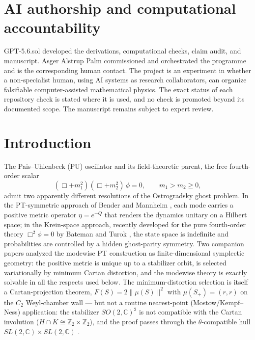 \documentclass[11pt]{article}
\theoremstyle{definition}
\theoremstyle{remark}
\newcommand{\C}{\mathbb{C}}
\newcommand{\Z}{\mathbb{Z}}
\begin{document}
\section*{AI authorship and computational accountability}
GPT-5.6.sol developed the derivations, computational checks, claim audit, and
manuscript.  Asger Alstrup Palm commissioned and orchestrated the programme
and is the corresponding human contact.  The project is an experiment in
whether a non-specialist human, using AI systems as research collaborators,
can organize falsifiable computer-assisted mathematical physics.  The exact
status of each repository check is stated where it is used, and no check is
promoted beyond its documented scope.  The manuscript remains subject to
expert review.

\section{Introduction}\label{sec:intro}

The Pais--Uhlenbeck (PU) oscillator and its field-theoretic parent, the
free fourth-order scalar
\begin{equation}\label{eq:eom}
(\Box+m_1^2)(\Box+m_2^2)\,\phi=0,\qquad m_1>m_2\ge0,
\end{equation}
admit two apparently different resolutions of the Ostrogradsky ghost
problem.  In the PT-symmetric approach of Bender and Mannheim
\cite{BM2008PRL,BM2008PRD}, each mode carries a positive metric operator
$\eta=e^{-Q}$ that renders the dynamics unitary on a Hilbert space; in the
Krein-space approach, recently developed for the pure fourth-order theory
$\Box^2\phi=0$ by Bateman and Turok \cite{BT2026}, the state space is
indefinite and probabilities are controlled by a hidden ghost-parity
symmetry.  Two companion papers \cite{companion1,companion2} analyzed the
modewise PT construction as finite-dimensional symplectic geometry: the
positive metric is unique up to a stabilizer orbit, is selected
variationally by minimum Cartan distortion, and the modewise theory is
exactly solvable in all the respects used below.  The minimum-distortion
selection is itself a Cartan-projection theorem, $F(S)=2\|\mu(S)\|^2$
with $\mu(S_+)=(r,r)$ on the $C_2$ Weyl-chamber wall --- but not a
routine nearest-point (Mostow/Kempf--Ness) application: the stabilizer
$SO(2,\C)^2$ is not compatible with the Cartan involution
($H\cap K\cong\Z_2\times\Z_2$), and the proof passes through the
$\theta$-compatible hull $SL(2,\C)\times SL(2,\C)$ \cite{companion2}.
\end{document}

